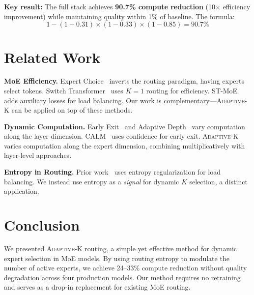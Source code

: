 \documentclass{article}
\newcommand{\adaptivek}{\textsc{Adaptive-K}}
\begin{document}
\textbf{Key result:} The full stack achieves \textbf{90.7\% compute reduction} (10$\times$ efficiency improvement) while maintaining quality within 1\% of baseline. The formula:
\begin{equation}
1 - (1 - 0.31) \times (1 - 0.33) \times (1 - 0.85) = 90.7\%
\end{equation}

\section{Related Work}
\label{sec:related}

\textbf{MoE Efficiency.} Expert Choice~\citep{zhou2022mixture} inverts the routing paradigm, having experts select tokens. Switch Transformer~\citep{fedus2022switch} uses $K=1$ routing for efficiency. ST-MoE~\citep{zoph2022st} adds auxiliary losses for load balancing. Our work is complementary---\adaptivek{} can be applied on top of these methods.

\textbf{Dynamic Computation.} Early Exit~\citep{schwartz2020right} and Adaptive Depth~\citep{elbayad2020depth} vary computation along the layer dimension. CALM~\citep{schuster2022confident} uses confidence for early exit. \adaptivek{} varies computation along the expert dimension, combining multiplicatively with layer-level approaches.

\textbf{Entropy in Routing.} Prior work~\citep{lewis2021base} uses entropy regularization for load balancing. We instead use entropy as a \textit{signal} for dynamic $K$ selection, a distinct application.

\section{Conclusion}

We presented \adaptivek{} routing, a simple yet effective method for dynamic expert selection in MoE models. By using routing entropy to modulate the number of active experts, we achieve 24--33\% compute reduction without quality degradation across four production models. Our method requires no retraining and serves as a drop-in replacement for existing MoE routing.
\end{document}
